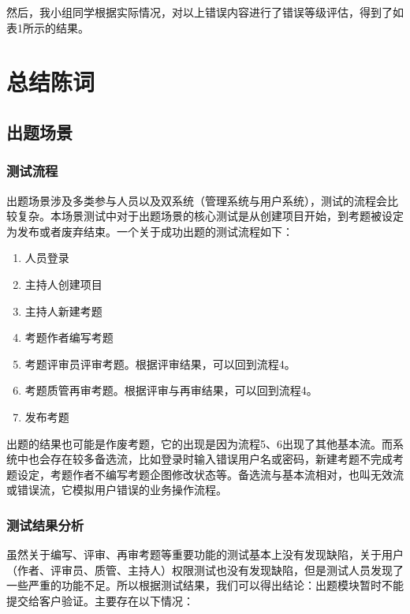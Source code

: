 \documentclass[hyperref, a4paper]{ctexart}
\begin{document}
然后，我小组同学根据实际情况，对以上错误内容进行了错误等级评估，得到了如表1所示的结果。

\hypertarget{ux603bux7ed3ux9648ux8bcd}{%
\section{总结陈词}\label{ux603bux7ed3ux9648ux8bcd}}

\hypertarget{ux51faux9898ux573aux666f-2}{%
\subsection{出题场景}\label{ux51faux9898ux573aux666f-2}}

\hypertarget{ux6d4bux8bd5ux6d41ux7a0b}{%
\subsubsection{测试流程}\label{ux6d4bux8bd5ux6d41ux7a0b}}

出题场景涉及多类参与人员以及双系统（管理系统与用户系统），测试的流程会比较复杂。本场景测试中对于出题场景的核心测试是从创建项目开始，到考题被设定为发布或者废弃结束。一个关于成功出题的测试流程如下：

\begin{enumerate}
\def\labelenumi{\arabic{enumi}.}
\item
  人员登录
\item
  主持人创建项目
\item
  主持人新建考题
\item
  考题作者编写考题
\item
  考题评审员评审考题。根据评审结果，可以回到流程4。
\item
  考题质管再审考题。根据评审与再审结果，可以回到流程4。
\item
  发布考题
\end{enumerate}

出题的结果也可能是作废考题，它的出现是因为流程5、6出现了其他基本流。而系统中也会存在较多备选流，比如登录时输入错误用户名或密码，新建考题不完成考题设定，考题作者不编写考题企图修改状态等。备选流与基本流相对，也叫无效流或错误流，它模拟用户错误的业务操作流程。

\hypertarget{ux6d4bux8bd5ux7ed3ux679cux5206ux6790}{%
\subsubsection{测试结果分析}\label{ux6d4bux8bd5ux7ed3ux679cux5206ux6790}}

虽然关于编写、评审、再审考题等重要功能的测试基本上没有发现缺陷，关于用户（作者、评审员、质管、主持人）权限测试也没有发现缺陷，但是测试人员发现了一些严重的功能不足。所以根据测试结果，我们可以得出结论：出题模块暂时不能提交给客户验证。主要存在以下情况：
\end{document}
